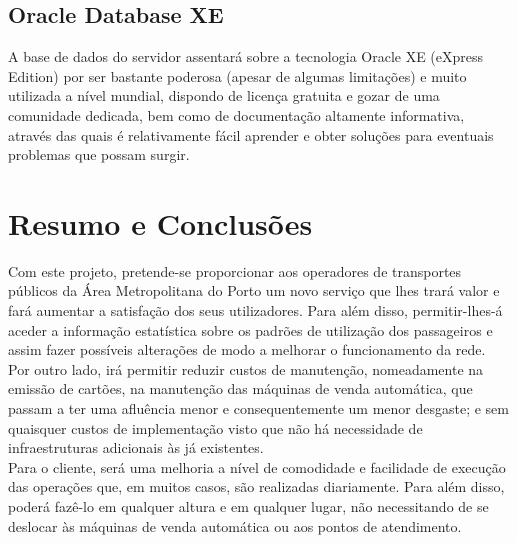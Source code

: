 \subsection{Oracle Database XE}

A base de dados do servidor assentará sobre a tecnologia Oracle XE (eXpress Edition) por ser bastante poderosa (apesar de algumas limitações) e muito utilizada a nível mundial, dispondo de licença gratuita e gozar de uma comunidade dedicada, bem como de documentação altamente informativa, através das quais é relativamente fácil aprender e obter soluções para eventuais problemas que possam surgir.

\section{Resumo e Conclusões}

Com este projeto, pretende-se proporcionar aos operadores de transportes públicos da Área Metropolitana do Porto um novo serviço que lhes trará valor e fará aumentar a satisfação dos seus utilizadores. Para além disso, permitir-lhes-á aceder a informação estatística sobre os padrões de utilização dos passageiros e assim fazer possíveis alterações de modo a melhorar o funcionamento da rede.
\\Por outro lado, irá permitir reduzir custos de manutenção, nomeadamente na emissão de cartões, na manutenção das máquinas de venda automática, que passam a ter uma afluência menor e consequentemente um menor desgaste; e sem quaisquer custos de implementação visto que não há necessidade de infraestruturas adicionais às já existentes.
\\Para o cliente, será uma melhoria a nível de comodidade e facilidade de execução das operações que, em muitos casos, são realizadas diariamente. Para além disso, poderá fazê-lo em qualquer altura e em qualquer lugar, não necessitando de se deslocar às máquinas de venda automática ou aos pontos de atendimento. 
